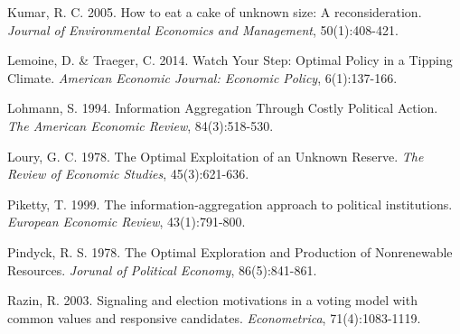 \documentclass[11pt,preprint, authoryear]{elsarticle}
\numberwithin{equation}{section}
\numberwithin{figure}{section}
\numberwithin{table}{section}
\begin{document}
Kumar, R. C. 2005. How to eat a cake of unknown size: A reconsideration.
\emph{Journal of Environmental Economics and Management}, 50(1):408-421.

Lemoine, D. \& Traeger, C. 2014. Watch Your Step: Optimal Policy in a
Tipping Climate. \emph{American Economic Journal: Economic Policy},
6(1):137-166.

Lohmann, S. 1994. Information Aggregation Through Costly Political
Action. \emph{The American Economic Review}, 84(3):518-530.

Loury, G. C. 1978. The Optimal Exploitation of an Unknown Reserve.
\emph{The Review of Economic Studies}, 45(3):621-636.

Piketty, T. 1999. The information-aggregation approach to political
institutions. \emph{European Economic Review}, 43(1):791-800.

Pindyck, R. S. 1978. The Optimal Exploration and Production of
Nonrenewable Resources. \emph{Jorunal of Political Economy},
86(5):841-861.

Razin, R. 2003. Signaling and election motivations in a voting model
with common values and responsive candidates. \emph{Econometrica},
71(4):1083-1119.


\end{document}
